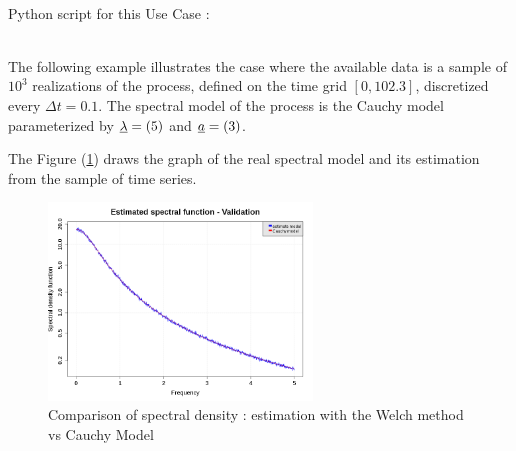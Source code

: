 \textspace\\
Python script for this Use Case :



\textspace\\


The following example illustrates the case where the available data is a sample of  $10^3$ realizations of the process, defined on the time grid  $[0, 102.3]$, discretized every $\Delta t = 0.1$. The spectral model of the process is the Cauchy model parameterized by ${\underline{\lambda}}=(5)$ and ${\underline{a}}=(3)$.

The Figure (\ref{welch_validation}) draws the graph of the real spectral model and its estimation from the sample of time series.
\begin{figure}[H]
  \begin{center}
    \includegraphics[width=7cm]{Figures/welchValidation.png}
    \caption{Comparison of spectral density : estimation with the Welch method vs Cauchy Model}
    \label{welch_validation}
  \end{center}
\end{figure}
